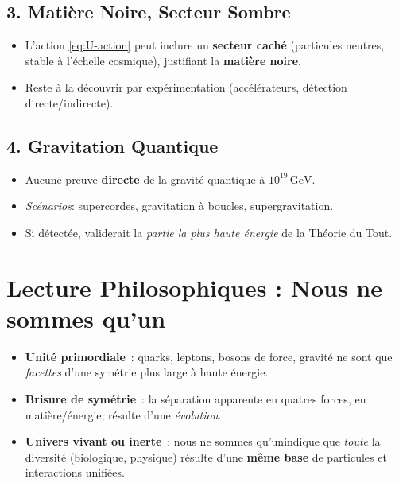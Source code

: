 \documentclass[12pt]{article}
\begin{document}
\subsection{3. Mati\`ere Noire, Secteur Sombre}
\begin{itemize}
    \item L'action \eqref{eq:U-action} peut inclure un \textbf{secteur cach\'e} 
          (particules neutres, stable \`a l'\'echelle cosmique), justifiant la \textbf{mati\`ere noire}. 
    \item Reste \`a la d\'ecouvrir par exp\'erimentation (acc\'el\'erateurs, d\'etection directe/indirecte).
\end{itemize}

\subsection{4. Gravitation Quantique}
\begin{itemize}
    \item Aucune preuve \textbf{directe} de la gravit\'e quantique \`a $10^{19}\,\mathrm{GeV}$. 
    \item \emph{Sc\'enarios}: supercordes, gravitation \`a boucles, supergravitation. 
    \item Si d\'etect\'ee, validerait la \emph{partie la plus haute \'energie} de la Th\'eorie du Tout.
\end{itemize}

\section{Lecture Philosophiques : \og Nous ne sommes qu'un\fg}
\label{sec:nous_ne_sommes_quun}

\begin{itemize}
    \item \textbf{Unit\'e primordiale}~: 
          quarks, leptons, bosons de force, gravit\'e ne sont que \emph{facettes} 
          d'une sym\'etrie plus large \`a haute \'energie.  
    \item \textbf{Brisure de sym\'etrie}~: 
          la s\'eparation apparente en quatres forces, en mati\`ere/\'energie, r\'esulte d'une \emph{\'evolution}.  
    \item \textbf{Univers vivant ou inerte}~: 
          \og nous ne sommes qu'un\fg indique que \emph{toute} la diversit\'e (biologique, physique) 
          r\'esulte d'une \textbf{m\^eme base} de particules et interactions unifi\'ees.
\end{itemize}
\end{document}
